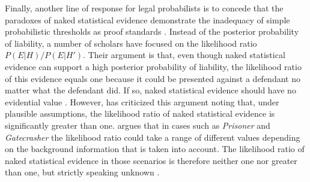 \documentclass{article}
\begin{document}
Finally, another line of response for legal probabilists is to concede that the paradoxes of naked statistical evidence demonstrate the inadequacy of simple probabilistic thresholds as proof standards  \citep{Urbaniak2019standards2}.
Instead of the posterior probability of liability, a number of scholars have focused on the likelihood ratio $P(E\vert H)/P(E \vert H')$. Their argument is that, even though naked statistical evidence can support a high posterior probability of liability, the likelihood ratio of this evidence equals one because it could be presented against a defendant  no matter what the defendant did. If so, naked statistical evidence should have no evidential value  \citep{cheng2012reconceptualizing,sullivan2016LikelihoodStoryTheory}. 
 However, \cite{dahlmanNakedStat2020} has criticized this argument noting that, under plausible assumptions, the likelihood ratio of naked statistical evidence is significantly greater than one.  %
\cite{dibello2019TrialStatisticsHigh} argues  
that in cases such as \textit{Prisoner} and \textit{Gatecrasher} the likelihood ratio could take a range of different values depending on the background information that is taken into account. The likelihood ratio of naked statistical evidence in those scenarios is therefore neither one nor greater than one, but strictly speaking unknown 
%
%
\citep[for a critique of this argument, see][]{Urbaniak2020Decision}.




\end{document}
